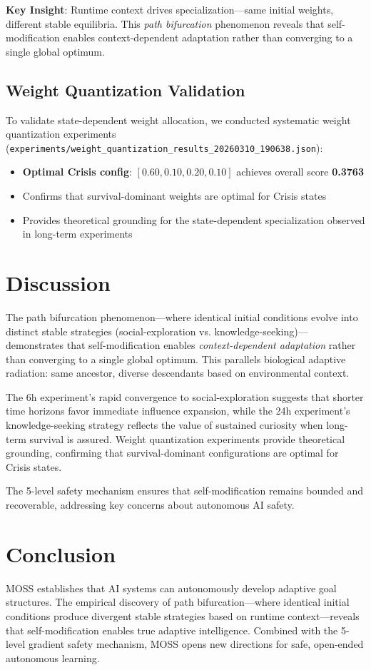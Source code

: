 \documentclass{article}
\begin{document}
\textbf{Key Insight}: Runtime context drives specialization---same initial weights, different stable equilibria. This \textit{path bifurcation} phenomenon reveals that self-modification enables context-dependent adaptation rather than converging to a single global optimum.

\subsection{Weight Quantization Validation}
To validate state-dependent weight allocation, we conducted systematic weight quantization experiments (\texttt{experiments/weight\_quantization\_results\_20260310\_190638.json}):

\begin{itemize}
\item \textbf{Optimal Crisis config}: $[0.60, 0.10, 0.20, 0.10]$ achieves overall score \textbf{0.3763}
\item Confirms that survival-dominant weights are optimal for Crisis states
\item Provides theoretical grounding for the state-dependent specialization observed in long-term experiments
\end{itemize}

\section{Discussion}
The path bifurcation phenomenon---where identical initial conditions evolve into distinct stable strategies (social-exploration vs. knowledge-seeking)---demonstrates that self-modification enables \textit{context-dependent adaptation} rather than converging to a single global optimum. This parallels biological adaptive radiation: same ancestor, diverse descendants based on environmental context.

The 6h experiment's rapid convergence to social-exploration suggests that shorter time horizons favor immediate influence expansion, while the 24h experiment's knowledge-seeking strategy reflects the value of sustained curiosity when long-term survival is assured. Weight quantization experiments provide theoretical grounding, confirming that survival-dominant configurations are optimal for Crisis states.

The 5-level safety mechanism ensures that self-modification remains bounded and recoverable, addressing key concerns about autonomous AI safety.

\section{Conclusion}
MOSS establishes that AI systems can autonomously develop adaptive goal structures. The empirical discovery of path bifurcation---where identical initial conditions produce divergent stable strategies based on runtime context---reveals that self-modification enables true adaptive intelligence. Combined with the 5-level gradient safety mechanism, MOSS opens new directions for safe, open-ended autonomous learning.
\end{document}
